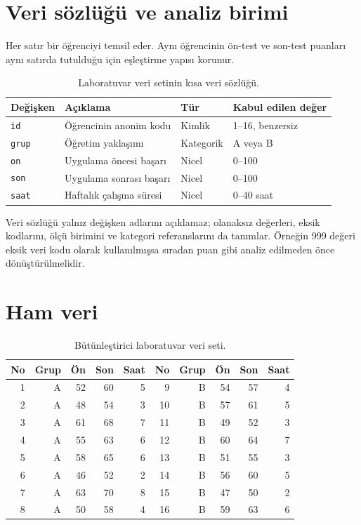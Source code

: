\section{Veri sözlüğü ve analiz birimi}

Her satır bir öğrenciyi temsil eder. Aynı öğrencinin ön-test ve son-test
puanları aynı satırda tutulduğu için eşleştirme yapısı korunur.

\begin{table}[htbp]
\centering
\caption{Laboratuvar veri setinin kısa veri sözlüğü.}
\begin{tabular}{@{}p{}p{}p{}p{}@{}}
\toprule
Değişken & Açıklama & Tür & Kabul edilen değer \\
\midrule
\texttt{id} & Öğrencinin anonim kodu & Kimlik & 1--16, benzersiz \\
\texttt{grup} & Öğretim yaklaşımı & Kategorik & A veya B \\
\texttt{on} & Uygulama öncesi başarı & Nicel & 0--100 \\
\texttt{son} & Uygulama sonrası başarı & Nicel & 0--100 \\
\texttt{saat} & Haftalık çalışma süresi & Nicel & 0--40 saat \\
\bottomrule
\end{tabular}
\end{table}

Veri sözlüğü yalnız değişken adlarını açıklamaz; olanaksız değerleri, eksik
kodlarını, ölçü birimini ve kategori referanslarını da tanımlar. Örneğin 999
değeri eksik veri kodu olarak kullanılmışsa sıradan puan gibi analiz edilmeden
önce dönüştürülmelidir.

\section{Ham veri}

\begin{table}[htbp]
\centering
\caption{Bütünleştirici laboratuvar veri seti.}
\small
\begin{tabular}{rrrrr@{\qquad}rrrrr}
\toprule
No & Grup & Ön & Son & Saat & No & Grup & Ön & Son & Saat \\
\midrule
1&A&52&60&5 & 9&B&54&57&4\\
2&A&48&54&3 &10&B&57&61&5\\
3&A&61&68&7 &11&B&49&52&3\\
4&A&55&63&6 &12&B&60&64&7\\
5&A&58&65&6 &13&B&51&55&3\\
6&A&46&52&2 &14&B&56&60&5\\
7&A&63&70&8 &15&B&47&50&2\\
8&A&50&58&4 &16&B&59&63&6\\
\bottomrule
\end{tabular}
\end{table}

